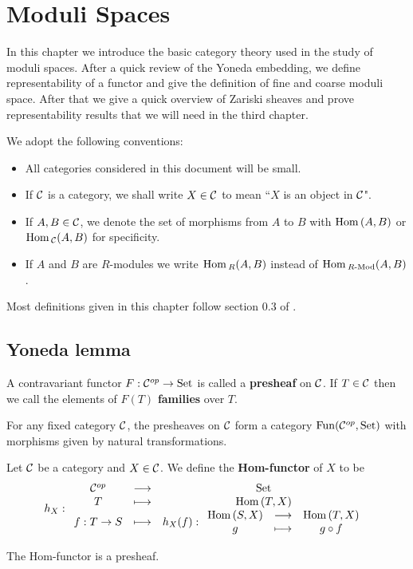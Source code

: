 \chapter{Moduli Spaces}

In this chapter we introduce the basic category theory used in the study of moduli spaces. After a quick review of the Yoneda embedding, we define representability of a functor and give the definition of fine and coarse moduli space. After that we give a quick overview of Zariski sheaves and prove representability results that we will need in the third chapter.\medskip

We adopt the following conventions:
\begin{itemize}
\item All categories considered in this document will be small.
\item If $\mathcal{C}$ is a category, we shall write $X\in \mathcal{C}$ to mean ``$X$ is an object in $\mathcal{C}$".
\item If $A,B\in \mathcal{C}$, we denote the set of morphisms from $A$ to $B$ with $\mathrm{Hom}\,(A,B)$ or $\mathrm{Hom}\,_{\mathcal{C}}(A,B)$ for specificity.
\item If $A$ and $B$ are $R$-modules we write $\mathrm{Hom}\,_R(A,B)$ instead of $\mathrm{Hom}\,_{R\text{-Mod}}(A,B)$.
\end{itemize}
Most definitions given in this chapter follow section 0.3 of \cite{Alper}.


\section{Yoneda lemma}
\begin{definition}[Presheaf]
A contravariant functor $F:\mathcal{C}^{op}\to \mathrm{Set}$ is called a \textbf{presheaf} on $\mathcal{C}$. If $T\in \mathcal{C}$ then we call the elements of $F(T)$ \textbf{families} over $T$.
\end{definition}
\begin{definition}
For any fixed category $\mathcal{C}$, the presheaves on $\mathcal{C}$ form a category $\mathrm{Fun}(\mathcal{C}^{op},\mathrm{Set})$ with morphisms given by natural transformations.
\end{definition}

\begin{definition}
Let $\mathcal{C}$ be a category and $X\in \mathcal{C}$. We define the \textbf{Hom-functor} of $X$ to be
\[h_X:\begin{array}{ccc} {\mathcal{C}^{op}} & \longrightarrow & {\mathrm{Set}}\\ {T} & \longmapsto & {\mathrm{Hom}\,(T,X)}\\ {f:T\to S} & \longmapsto & {h_X(f):\begin{array}{ccc} {\mathrm{Hom}\,(S,X)} & \longrightarrow & {\mathrm{Hom}\,(T,X)}\\ {g} & \longmapsto & {g\circ f} \end{array}} \end{array}\]
\end{definition}
\begin{remark}
The Hom-functor is a presheaf.
\end{remark}


